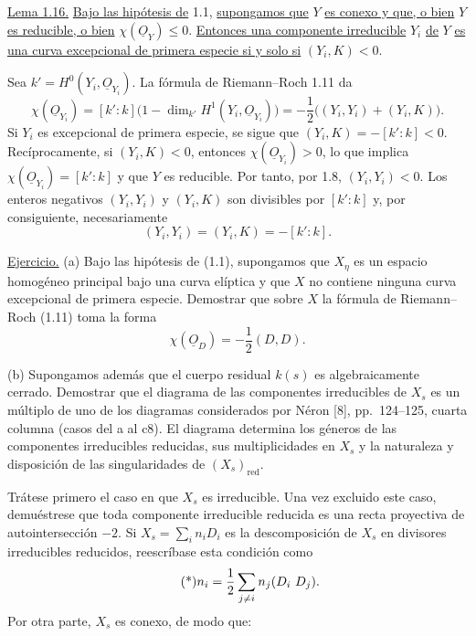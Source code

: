 \medskip
\noindent\underline{Lema 1.16.}
\underline{Bajo las hipótesis de} 1.1, \underline{supongamos que} $Y$
\underline{es conexo y que, o bien} $Y$ \underline{es reducible, o bien}
$\chi(\underline{O}_Y)\leq0$. \underline{Entonces una componente irreducible}
$Y_i$ \underline{de} $Y$ \underline{es una curva excepcional de primera especie
si y solo si} $(Y_i,K)<0$.

Sea $k'=H^0(Y_i,\underline{O}_{Y_i})$. La fórmula de Riemann--Roch 1.11 da
\begin{equation*}
\chi(\underline{O}_{Y_i})
=[k':k]\bigl(1-\dim_{k'}H^1(Y_i,\underline{O}_{Y_i})\bigr)
=-\frac12\bigl((Y_i,Y_i)+(Y_i,K)\bigr).
\end{equation*}
Si $Y_i$ es excepcional de primera especie, se sigue que
$(Y_i,K)=-[k':k]<0$. Recíprocamente, si $(Y_i,K)<0$, entonces
$\chi(\underline{O}_{Y_i})>0$, lo que implica
$\chi(\underline{O}_{Y_i})=[k':k]$ y que $Y$ es reducible. Por tanto, por 1.8,
$(Y_i,Y_i)<0$. Los enteros negativos $(Y_i,Y_i)$ y $(Y_i,K)$ son divisibles por
$[k':k]$ y, por consiguiente, necesariamente
\begin{equation*}
(Y_i,Y_i)=(Y_i,K)=-[k':k].
\end{equation*}

\medskip
\noindent\underline{Ejercicio.}
(a) Bajo las hipótesis de (1.1), supongamos que $X_\eta$ es un espacio homogéneo
principal bajo una curva elíptica y que $X$ no contiene ninguna curva
excepcional de primera especie. Demostrar que sobre $X$ la fórmula de
Riemann--Roch (1.11) toma la forma
\begin{equation*}
\chi(\underline{O}_D)=-\frac12(D,D).
\end{equation*}

\pageoriginale

(b) Supongamos además que el cuerpo residual $k(s)$ es algebraicamente cerrado.
Demostrar que el diagrama de las componentes irreducibles de $X_s$ es un
múltiplo de uno de los diagramas considerados por Néron [8], pp.~124--125,
cuarta columna (casos del a al c8). El diagrama determina los géneros de las
componentes irreducibles reducidas, sus multiplicidades en $X_s$ y la naturaleza
y disposición de las singularidades de $(X_s)_{\mathrm{red}}$.

Trátese primero el caso en que $X_s$ es irreducible. Una vez excluido este caso,
demuéstrese que toda componente irreducible reducida es una recta proyectiva de
autointersección $-2$. Si $X_s=\sum_i n_iD_i$ es la descomposición de $X_s$ en
divisores irreducibles reducidos, reescríbase esta condición como
\begin{equation}\tag{*}
n_i=\frac12\sum_{j\ne i}\sisi{n_i}{n_j}(D_i\ D_j).
\end{equation}
Por otra parte, $X_s$ es conexo, de modo que:

